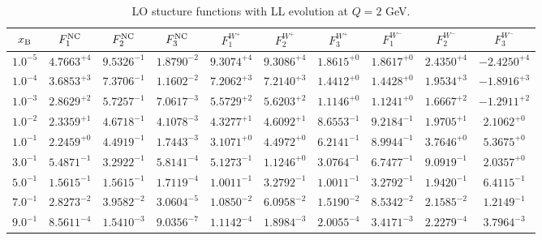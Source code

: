 \begin{table}[h]
\begin{adjustbox}{width=\textwidth}
\begin{tabular}{|c||c|c|c|c|c|c|c|c|c|}
\hline
$x_{\rm B}$ & $F_1^{\rm NC}$ & $F_2^{\rm NC}$ & $F_3^{\rm NC}$ & $F_1^{W^+}$ & $F_2^{W^+}$ & $F_3^{W^+}$ & $F_1^{W^-}$ & $F_2^{W^-}$ & $F_3^{W^-}$ \\
\hline
$ 1.0^{-5}$ & $ 4.7663^{+4}$ & $ 9.5326^{-1}$ & $ 1.8790^{-2}$ & $ 9.3074^{+4}$ & $ 9.3086^{+4}$ & $ 1.8615^{+0}$ & $ 1.8617^{+0}$ & $ 2.4350^{+4}$ & $-2.4250^{+4}$ \\
$ 1.0^{-4}$ & $ 3.6853^{+3}$ & $ 7.3706^{-1}$ & $ 1.1602^{-2}$ & $ 7.2062^{+3}$ & $ 7.2140^{+3}$ & $ 1.4412^{+0}$ & $ 1.4428^{+0}$ & $ 1.9534^{+3}$ & $-1.8916^{+3}$ \\
$ 1.0^{-3}$ & $ 2.8629^{+2}$ & $ 5.7257^{-1}$ & $ 7.0617^{-3}$ & $ 5.5729^{+2}$ & $ 5.6203^{+2}$ & $ 1.1146^{+0}$ & $ 1.1241^{+0}$ & $ 1.6667^{+2}$ & $-1.2911^{+2}$ \\
$ 1.0^{-2}$ & $ 2.3359^{+1}$ & $ 4.6718^{-1}$ & $ 4.1078^{-3}$ & $ 4.3277^{+1}$ & $ 4.6092^{+1}$ & $ 8.6553^{-1}$ & $ 9.2184^{-1}$ & $ 1.9705^{+1}$ & $ 2.1062^{+0}$ \\
$ 1.0^{-1}$ & $ 2.2459^{+0}$ & $ 4.4919^{-1}$ & $ 1.7443^{-3}$ & $ 3.1071^{+0}$ & $ 4.4972^{+0}$ & $ 6.2141^{-1}$ & $ 8.9944^{-1}$ & $ 3.7646^{+0}$ & $ 5.3675^{+0}$ \\
$ 3.0^{-1}$ & $ 5.4871^{-1}$ & $ 3.2922^{-1}$ & $ 5.8141^{-4}$ & $ 5.1273^{-1}$ & $ 1.1246^{+0}$ & $ 3.0764^{-1}$ & $ 6.7477^{-1}$ & $ 9.0919^{-1}$ & $ 2.0357^{+0}$ \\
$ 5.0^{-1}$ & $ 1.5615^{-1}$ & $ 1.5615^{-1}$ & $ 1.7119^{-4}$ & $ 1.0011^{-1}$ & $ 3.2792^{-1}$ & $ 1.0011^{-1}$ & $ 3.2792^{-1}$ & $ 1.9420^{-1}$ & $ 6.4115^{-1}$ \\
$ 7.0^{-1}$ & $ 2.8273^{-2}$ & $ 3.9582^{-2}$ & $ 3.0604^{-5}$ & $ 1.0850^{-2}$ & $ 6.0958^{-2}$ & $ 1.5190^{-2}$ & $ 8.5342^{-2}$ & $ 2.1585^{-2}$ & $ 1.2149^{-1}$ \\
$ 9.0^{-1}$ & $ 8.5611^{-4}$ & $ 1.5410^{-3}$ & $ 9.0356^{-7}$ & $ 1.1142^{-4}$ & $ 1.8984^{-3}$ & $ 2.0055^{-4}$ & $ 3.4171^{-3}$ & $ 2.2279^{-4}$ & $ 3.7964^{-3}$ \\
\hline
\end{tabular}
\end{adjustbox}\caption{LO stucture functions with LL evolution at $Q = 2$ GeV.}
\label{tab:N0LO-Q2}
\end{table}


